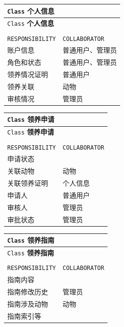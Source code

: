 \documentclass[12pt,a4paper,UTF8]{article}
\begin{document}
\begin{xltabular}{\linewidth}{|>{\raggedright\arraybackslash}p{8cm}|>{\raggedright\arraybackslash}p{4cm}|}
  \hline
  \verb|Class| \textbf{个人信息} &  \\ \hline \endfirsthead
  \hline
  \verb|Class| \textbf{个人信息} &  \\ \hline \endhead
  \hline
   \\ \endfoot
  \hline \endlastfoot

  \verb|RESPONSIBILITY| & \verb|COLLABORATOR| \\ \hline
  账户信息 & 普通用户、管理员 \\ \hline
  角色和状态 & 普通用户、管理员 \\ \hline
  领养情况证明 & 普通用户 \\ \hline
  领养关联 &  动物 \\ \hline
  审核情况 & 管理员 \\ \hline
\end{xltabular}

\vspace{1cm}

\begin{xltabular}{\linewidth}{|>{\raggedright\arraybackslash}p{8cm}|>{\raggedright\arraybackslash}p{4cm}|}
  \hline
  \verb|Class| \textbf{领养申请} &  \\ \hline \endfirsthead
  \hline
  \verb|Class| \textbf{领养申请} &  \\ \hline \endhead
  \hline
   \\ \endfoot
  \hline \endlastfoot

  \verb|RESPONSIBILITY| & \verb|COLLABORATOR| \\ \hline
  申请状态 &  \\ \hline
  关联动物 & 动物 \\ \hline
  关联领养证明 & 个人信息 \\ \hline
  申请人 & 普通用户 \\ \hline
  审核人 &  管理员 \\ \hline
  审批状态 & 管理员 \\ \hline
\end{xltabular}

\vspace{1cm}

\begin{xltabular}{\linewidth}{|>{\raggedright\arraybackslash}p{8cm}|>{\raggedright\arraybackslash}p{4cm}|}
  \hline
  \verb|Class| \textbf{领养指南} &  \\ \hline \endfirsthead
  \hline
  \verb|Class| \textbf{领养指南} &  \\ \hline \endhead
  \hline
   \\ \endfoot
  \hline \endlastfoot

  \verb|RESPONSIBILITY| & \verb|COLLABORATOR| \\ \hline
  指南内容 &  \\ \hline
  指南修改历史 & 管理员 \\ \hline
  指南涉及动物 & 动物 \\ \hline
  指南索引等 & \\ \hline
\end{xltabular}
\end{document}
